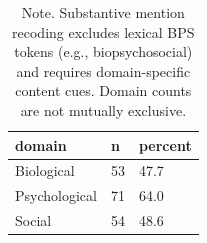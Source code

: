 \begin{table}[htbp]
\raggedright
\caption{Biological, psychological, and social substantive mentions in Stage 2.}
\label{tab.domains}
\begin{tabular}{lll}
\toprule
domain & n & percent \\
\midrule
Biological & 53 & 47.7 \\
Psychological & 71 & 64.0 \\
Social & 54 & 48.6 \\
\bottomrule
\end{tabular}

\caption*{Note. Substantive mention recoding excludes lexical BPS tokens (e.g., biopsychosocial) and requires domain-specific content cues. Domain counts are not mutually exclusive.}
\end{table}
